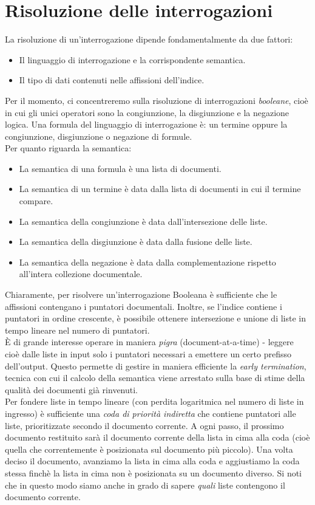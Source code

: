 \section{Risoluzione delle interrogazioni}
La risoluzione di un'interrogazione dipende fondamentalmente da due fattori:
\begin{itemize}
    \item Il linguaggio di interrogazione e la corrispondente semantica.
    \item Il tipo di dati contenuti nelle affissioni dell'indice.
\end{itemize}
Per il momento, ci concentreremo sulla risoluzione di interrogazioni \textit{booleane}, cioè in cui gli unici operatori sono la congiunzione, la disgiunzione e la negazione logica. Una formula del linguaggio di interrogazione è: un termine oppure la congiunzione, disgiunzione o negazione di formule.\\
Per quanto riguarda la semantica:
\begin{itemize}
    \item La semantica di una formula è una lista di documenti.
    \item La semantica di un termine è data dalla lista di documenti in cui il termine compare.
    \item La semantica della congiunzione è data dall'intersezione delle liste.
    \item La semantica della disgiunzione è data dalla fusione delle liste.
    \item La semantica della negazione è data dalla complementazione rispetto all'intera collezione documentale.
\end{itemize}
Chiaramente, per risolvere un'interrogazione Booleana è sufficiente che le affissioni contengano i puntatori documentali. Inoltre, se l'indice contiene i puntatori in ordine crescente, è possibile ottenere intersezione e unione di liste in tempo lineare nel numero di puntatori.\\
È di grande interesse operare in maniera \textit{pigra} (document-at-a-time) - leggere cioè dalle liste in input solo i puntatori necessari a emettere un certo prefisso dell'output. Questo permette di gestire in maniera efficiente la \textit{early termination}, tecnica con cui il calcolo della semantica viene arrestato sulla base di stime della qualità dei documenti già rinvenuti.\\
Per fondere liste in tempo lineare (con perdita logaritmica nel numero di liste in ingresso) è sufficiente una \textit{coda di priorità indiretta} che contiene puntatori alle liste, prioritizzate secondo il documento corrente. A ogni passo, il prossimo documento restituito sarà il documento corrente della lista in cima alla coda (cioè quella che correntemente è posizionata sul documento più piccolo). Una volta deciso il documento, avanziamo la lista in cima alla coda e aggiustiamo la coda stessa finchè la lista in cima non è posizionata su un documento diverso. Si noti che in questo modo siamo anche in grado di sapere \textit{quali} liste contengono il documento corrente.\\
